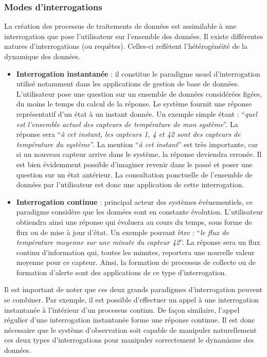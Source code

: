 \subsubsection{Modes d'interrogations}
La création des processus de traitements de données est assimilable à une interrogation que pose l'utilisateur sur l'ensemble des données. Il existe différentes natures d'interrogations (ou requêtes). Celles-ci reflètent l'hétérogénéité de la dynamique des données.
\begin{itemize}
    \item \textbf{Interrogation instantanée} : il constitue le paradigme usuel d'interrogation utilisé notamment dans les applications de gestion de base de données. L'utilisateur pose une question sur un ensemble de données considérées figées, du moins le temps du calcul de la réponse. Le système fournit une réponse représentatif d'un état à un instant donnée. Un exemple simple étant : \enquote{\it quel est l'ensemble actuel des capteurs de température de mon système}. La réponse sera \enquote{\it à cet instant, les capteurs 1, 4 et 42 sont des capteurs de température du système}. La mention \enquote{\it à cet instant} est très importante, car si un nouveau capteur arrive dans le système, la réponse deviendra erronée. Il est bien évidemment possible d'imaginer revenir dans le passé et poser une question sur un état antérieur. La consultation ponctuelle de l'ensemble de données par l'utilisateur est donc une application de cette interrogation.
    \item \textbf{Interrogation continue} : principal acteur des systèmes événementiels, ce paradigme considère que les données sont en constante évolution. L'utilisateur obtiendra ainsi une réponse qui évoluera au cours du temps, sous forme de flux ou de mise à jour d'état. Un exemple pouvant être : \enquote{\it le flux de température moyenne sur une minute du capteur 42}. La réponse sera un flux continu d'information qui, toutes les minutes, reportera une nouvelle valeur moyenne pour ce capteur. Ainsi, la formation de processus de collecte ou de formation d'alerte sont des applications de ce type d'interrogation.
\end{itemize}
Il est important de noter que ces deux grands paradigmes d'interrogation peuvent se combiner. Par exemple, il est possible d'effectuer un appel à une interrogation instantanée à l'intérieur d'un processus continu. De façon similaire, l'appel régulier d'une interrogation instantanée forme une réponse continue. Il est donc nécessaire que le système d'observation soit capable de manipuler naturellement ces deux types d'interrogations pour manipuler correctement le dynamisme des données.

